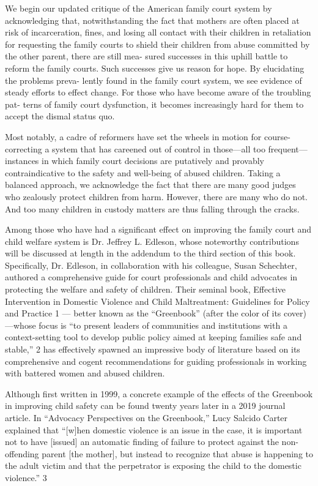 


\pfl{}

We begin our updated critique of the American family court system by
acknowledging that, notwithstanding the fact that mothers are often
placed at risk of incarceration, fines, and losing all contact with their
children in retaliation for requesting the family courts to shield their
children from abuse committed by the other parent, there are still mea-
sured successes in this uphill battle to reform the family courts. Such
successes give us reason for hope. By elucidating the problems preva-
lently found in the family court system, we see evidence of steady efforts
to effect change. For those who have become aware of the troubling pat-
terns of family court dysfunction, it becomes increasingly hard for them
to accept the dismal status quo. \pfl{}

Most notably, a cadre of reformers have set the wheels in motion for
course-correcting a system that has careened out of control in those—all
too frequent—instances in which family court decisions are putatively
and provably contraindicative to the safety and well-being of abused
children. Taking a balanced approach, we acknowledge the fact that
there are many good judges who zealously protect children from harm.
However, there are many who do not. And too many children in custody
matters are thus falling through the cracks. \pfl{}

Among those who have had a significant effect on improving the
family court and child welfare system is Dr. Jeffrey L. Edleson, whose
noteworthy contributions will be discussed at length in the addendum to
the third section of this book. Specifically, Dr. Edleson, in collaboration
with his colleague, Susan Schechter, authored a comprehensive guide
for court professionals and child advocates in protecting the welfare and
safety of children. Their seminal book, Effective Intervention in Domestic
Violence and Child Maltreatment: Guidelines for Policy and Practice 1 —
better known as the “Greenbook” (after the color of its cover)—whose
focus is “to present leaders of communities and institutions with a
context-setting tool to develop public policy aimed at keeping families
safe and stable,” 2 has effectively spawned an impressive body of literature
based on its comprehensive and cogent recommendations for guiding
professionals in working with battered women and abused children. \pfl{}

Although first written in 1999, a concrete example of the effects of
the Greenbook in improving child safety can be found twenty years later
in a 2019 journal article. In “Advocacy Perspectives on the Greenbook,”
Lucy Salcido Carter explained that “[w]hen domestic violence is an issue
in the case, it is important not to have [issued] an automatic finding
of failure to protect against the non-offending parent [the mother], but
instead to recognize that abuse is happening to the adult victim and that
the perpetrator is exposing the child to the domestic violence.” 3 \pfl{}


